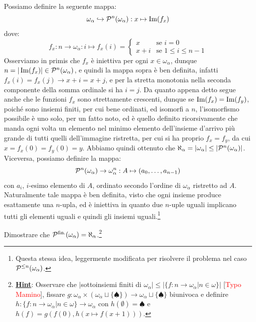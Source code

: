\begin{soln}
	Possiamo definire la seguente mappa:
	\[ \omega_\alpha \hookrightarrow \mathcal{P}^n(\omega_\alpha) : x \mapsto \operatorname{Im}(f_x)
		\]
	dove:
	\[ f_x : n \to \omega_\alpha : i \mapsto f_x(i) = \begin{cases}
		x &\text{se $i = 0$} \\
		x + i &\text{se $1 \leq i \leq n - 1$}
	\end{cases}
		\]
	Osserviamo in primis che $f_x$ è iniettiva per ogni $x \in \omega_\alpha$, dunque $n = |\operatorname{Im}(f_x)| \in \mathcal{P}^n(\omega_\alpha)$, e quindi la mappa sopra è ben definita, infatti $f_x(i) = f_x(j) \to x + i = x + j$,
	e per la stretta monotonia nella seconda componente della somma ordinale si ha $i = j$. Da quanto appena detto segue anche che le funzioni $f_x$ sono strettamente crescenti,
	dunque se $\operatorname{Im}(f_x) = \operatorname{Im}(f_y)$, poiché sono insiemi finiti, per cui bene ordinati, ed isomorfi a $n$, l'isomorfismo possibile è uno solo, per un fatto noto, ed è quello definito ricorsivamente che manda ogni volta un elemento 
	nel minimo elemento dell'insieme d'arrivo più grande di tutti quelli dell'immagine ristretta, per cui si ha proprio $f_x = f_y$, da cui $x = f_x(0) = f_y(0) = y$. Abbiamo quindi ottenuto che $\aleph_\alpha = |\omega_\alpha| \leq |\mathcal{P}^n(\omega_\alpha)|$.\\
	Viceversa, possiamo definire la mappa:
	\[ \mathcal{P}^n(\omega_\alpha) \to \omega_\alpha^n : A \mapsto (a_0,\ldots,a_{n-1})
		\]
	con $a_i$, $i$-esimo elemento di $A$, ordinato secondo l'ordine di $\omega_\alpha$ ristretto ad $A$. Naturalmente tale mappa è ben definita, visto che ogni insieme produce esattamente una $n$-upla, ed è iniettiva in quanto due $n$-uple uguali implicano tutti
	gli elementi uguali e quindi gli insiemi uguali.\footnote{Questa stessa idea, leggermente modificata per risolvere il problema nel caso $\mathcal{P}^{\leq n}(\omega_\alpha)$.}
\end{soln}

\begin{exercise}
	Dimostrare che $\mathcal{P}^{\text{fin.}}(\omega_\alpha) = \aleph_\alpha$.\footnote{\textbf{\underline{Hint}}: Osservare che $|$sottoinsiemi finiti di $\omega_\alpha| \leq |\{f : n \to \omega_\alpha | n \in \omega\}|$ [\textcolor{red}{Typo Mamino}], fissare $g : \omega_\alpha \times (\omega_\alpha \sqcup \{\spadesuit\}) \to \omega_\alpha \sqcup \{\spadesuit\}$ biunivoca e definire
	$h : \{f : n \to \omega_\alpha | n \in \omega\} \to \omega_\alpha$ con $h(\emptyset) = \spadesuit$ e $h(f) = g(f(0),h(x \mapsto f(x+1)))$.}
\end{exercise}

